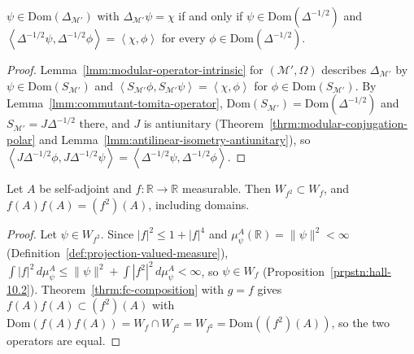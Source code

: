 \begin{lemma}
    \label{lmm:commutant-modular-operator-intrinsic}
    \leanok
    $\psi \in \text{Dom}(\Delta_{\mathcal{M}'})$ with $\Delta_{\mathcal{M}'}\psi = \chi$ if and only if $\psi \in \text{Dom}(\Delta^{-1/2})$ and $\left< \Delta^{-1/2}\psi, \Delta^{-1/2}\phi \right> = \left< \chi, \phi \right>$ for every $\phi \in \text{Dom}(\Delta^{-1/2})$.
\end{lemma}
\begin{proof}
    \leanok
    Lemma~\ref{lmm:modular-operator-intrinsic} for $(\mathcal{M}', \Omega)$ describes $\Delta_{\mathcal{M}'}$ by $\psi \in \text{Dom}(S_{\mathcal{M}'})$ and $\left< S_{\mathcal{M}'}\phi, S_{\mathcal{M}'}\psi \right> = \left< \chi, \phi \right>$ for $\phi \in \text{Dom}(S_{\mathcal{M}'})$. By Lemma~\ref{lmm:commutant-tomita-operator}, $\text{Dom}(S_{\mathcal{M}'}) = \text{Dom}(\Delta^{-1/2})$ and $S_{\mathcal{M}'} = J\Delta^{-1/2}$ there, and $J$ is antiunitary (Theorem~\ref{thrm:modular-conjugation-polar} and Lemma~\ref{lmm:antilinear-isometry-antiunitary}), so $\left< J\Delta^{-1/2}\phi, J\Delta^{-1/2}\psi \right> = \left< \Delta^{-1/2}\psi, \Delta^{-1/2}\phi \right>$.
\end{proof}

\begin{lemma}
    \label{lmm:fc-domain-square}
    \leanok
    Let $A$ be self-adjoint and $f : \mathbb{R} \to \mathbb{R}$ measurable. Then $W_{f^2} \subset W_f$, and $f(A)f(A) = (f^2)(A)$, including domains.
\end{lemma}
\begin{proof}
    \leanok
    Let $\psi \in W_{f^2}$. Since $|f|^2 \le 1 + |f|^4$ and $\mu^A_\psi(\mathbb{R}) = \|\psi\|^2 < \infty$ (Definition~\ref{def:projection-valued-measure}), $\int |f|^2 \, d\mu^A_\psi \le \|\psi\|^2 + \int |f^2|^2 \, d\mu^A_\psi < \infty$, so $\psi \in W_f$ (Proposition~\ref{prpstn:hall-10.2}). Theorem~\ref{thrm:fc-composition} with $g = f$ gives $f(A)f(A) \subset (f^2)(A)$ with $\text{Dom}(f(A)f(A)) = W_f \cap W_{f^2} = W_{f^2} = \text{Dom}((f^2)(A))$, so the two operators are equal.
\end{proof}

